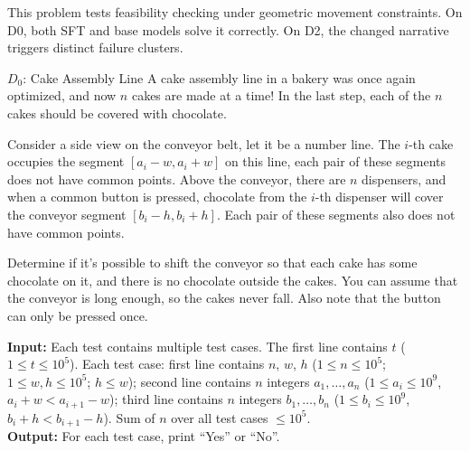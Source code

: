 \documentclass[]{bytedance_seed}
\theoremstyle{plain}
\theoremstyle{definition}
\theoremstyle{remark}
\begin{document}
This problem tests feasibility checking under geometric movement constraints. On D0, both SFT and base models solve it correctly. On D2, the changed narrative triggers distinct failure clusters.

\begin{problembox}{$D_0$: Cake Assembly Line}
A cake assembly line in a bakery was once again optimized, and now $n$ cakes are made at a time! In the last step, each of the $n$ cakes should be covered with chocolate.

Consider a side view on the conveyor belt, let it be a number line. The $i$-th cake occupies the segment $[a_i - w, a_i + w]$ on this line, each pair of these segments does not have common points. Above the conveyor, there are $n$ dispensers, and when a common button is pressed, chocolate from the $i$-th dispenser will cover the conveyor segment $[b_i - h, b_i + h]$. Each pair of these segments also does not have common points.

Determine if it's possible to shift the conveyor so that each cake has some chocolate on it, and there is no chocolate outside the cakes. You can assume that the conveyor is long enough, so the cakes never fall. Also note that the button can only be pressed once.

\vspace{1.5mm}
\noindent\textbf{Input:} Each test contains multiple test cases. The first line contains $t$ ($1 \le t \le 10^5$). Each test case: first line contains $n$, $w$, $h$ ($1 \le n \le 10^5$; $1 \le w, h \le 10^5$; $h \le w$); second line contains $n$ integers $a_1, \ldots, a_n$ ($1 \le a_i \le 10^9$, $a_i + w < a_{i+1} - w$); third line contains $n$ integers $b_1, \ldots, b_n$ ($1 \le b_i \le 10^9$, $b_i + h < b_{i+1} - h$). Sum of $n$ over all test cases $\le 10^5$.\\
\textbf{Output:} For each test case, print ``Yes'' or ``No''.
\end{problembox}
\end{document}
